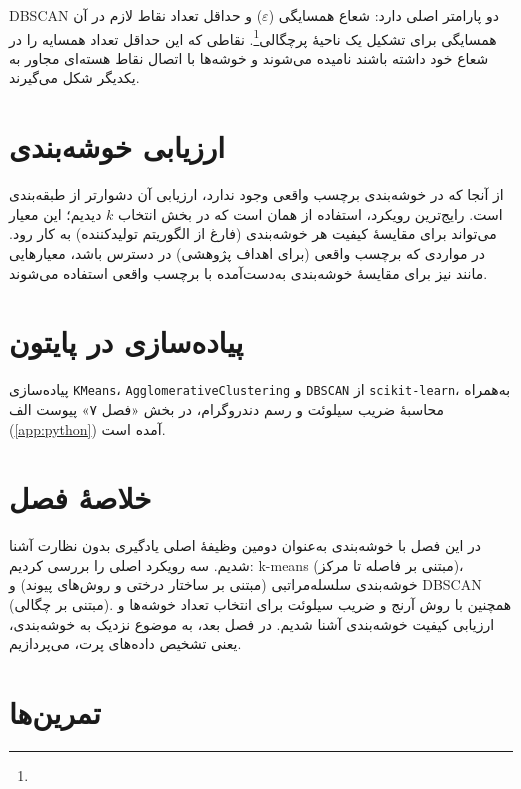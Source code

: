 DBSCAN دو پارامتر اصلی دارد: شعاع همسایگی ($\varepsilon$) و حداقل تعداد
نقاط لازم در آن همسایگی برای تشکیل یک ناحیهٔ پرچگالی\footnote{}.
نقاطی که این حداقل تعداد همسایه را در شعاع خود
داشته باشند  نامیده می‌شوند و خوشه‌ها
با اتصال نقاط هسته‌ای مجاور به یکدیگر شکل می‌گیرند.

\section{ارزیابی خوشه‌بندی}

از آنجا که در خوشه‌بندی برچسب واقعی وجود ندارد، ارزیابی آن دشوارتر از
طبقه‌بندی است. رایج‌ترین رویکرد، استفاده از همان
 است که در بخش انتخاب $k$
دیدیم؛ این معیار می‌تواند برای مقایسهٔ کیفیت هر خوشه‌بندی (فارغ از
الگوریتم تولیدکننده) به کار رود. در مواردی که برچسب واقعی (برای اهداف
پژوهشی) در دسترس باشد، معیارهایی مانند
 نیز برای
مقایسهٔ خوشه‌بندی به‌دست‌آمده با برچسب واقعی استفاده می‌شوند.

\section*{پیاده‌سازی در پایتون}

پیاده‌سازی \texttt{KMeans}، \texttt{AgglomerativeClustering} و
\texttt{DBSCAN} از \texttt{scikit-learn}، به‌همراه محاسبهٔ ضریب سیلوئت
و رسم دندروگرام، در بخش «فصل ۷» پیوست الف (\ref{app:python}) آمده است.

\section*{خلاصهٔ فصل}

در این فصل با خوشه‌بندی به‌عنوان دومین وظیفهٔ اصلی یادگیری بدون نظارت
آشنا شدیم. سه رویکرد اصلی را بررسی کردیم: k-means (مبتنی بر فاصله تا
مرکز)، خوشه‌بندی سلسله‌مراتبی (مبتنی بر ساختار درختی و روش‌های پیوند)
و DBSCAN (مبتنی بر چگالی). همچنین با روش آرنج و ضریب سیلوئت برای انتخاب
تعداد خوشه‌ها و ارزیابی کیفیت خوشه‌بندی آشنا شدیم. در فصل بعد، به
موضوع نزدیک به خوشه‌بندی، یعنی تشخیص داده‌های پرت، می‌پردازیم.

\section*{تمرین‌ها}

